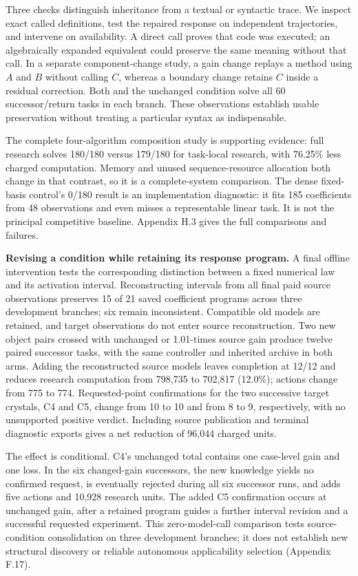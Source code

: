 \documentclass[twoside,11pt]{article}
\begin{document}
Three checks distinguish inheritance from a textual or syntactic trace. We inspect exact called definitions, test the repaired response on independent trajectories, and intervene on availability. A direct call proves that code was executed; an algebraically expanded equivalent could preserve the same meaning without that call. In a separate component-change study, a gain change replays a method using \(A\) and \(B\) without calling \(C\), whereas a boundary change retains \(C\) inside a residual correction. Both and the unchanged condition solve all 60 successor/return tasks in each branch. These observations establish usable preservation without treating a particular syntax as indispensable.


The complete four-algorithm composition study is supporting evidence: full research solves 180/180 versus 179/180 for task-local research, with 76.25\% less charged computation. Memory and unused sequence-resource allocation both change in that contrast, so it is a complete-system comparison. The dense fixed-basis control's 0/180 result is an implementation diagnostic: it fits 185 coefficients from 48 observations and even misses a representable linear task. It is not the principal competitive baseline. Appendix H.3 gives the full comparisons and failures.


\textbf{Revising a condition while retaining its response program.} A final offline intervention tests the corresponding distinction between a fixed numerical law and its activation interval. Reconstructing intervals from all final paid source observations preserves 15 of 21 saved coefficient programs across three development branches; six remain inconsistent. Compatible old models are retained, and target observations do not enter source reconstruction. Two new object pairs crossed with unchanged or 1.01-times source gain produce twelve paired successor tasks, with the same controller and inherited archive in both arms. Adding the reconstructed source models leaves completion at 12/12 and reduces research computation from 798,735 to 702,817 (12.0\%); actions change from 775 to 774. Requested-point confirmations for the two successive target crystals, C4 and C5, change from 10 to 10 and from 8 to 9, respectively, with no unsupported positive verdict. Including source publication and terminal diagnostic exports gives a net reduction of 96,044 charged units.


The effect is conditional. C4's unchanged total contains one case-level gain and one loss. In the six changed-gain successors, the new knowledge yields no confirmed request, is eventually rejected during all six successor runs, and adds five actions and 10,928 research units. The added C5 confirmation occurs at unchanged gain, after a retained program guides a further interval revision and a successful requested experiment. This zero-model-call comparison tests source-condition consolidation on three development branches; it does not establish new structural discovery or reliable autonomous applicability selection (Appendix F.17).
\end{document}
